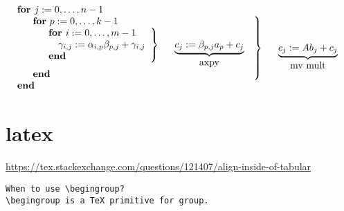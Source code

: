 \documentclass[a4paper,12pt]{article}
\begin{document}
\begingroup
\arraycolsep=1.4pt
\begin{equation*}
\begin{array}{l}
\textbf{for~}  j := 0, \ldots , n-1 \\
\hspace{1em}
\left. \begin{array}{l}
{\bf for~} p := 0, \ldots , k-1  \\
\hspace{1em}
\left. \begin{array}{l}
\textbf{for~} i := 0, \ldots , m-1  \\
\hspace{1em} \gamma_{i,j} := \alpha_{i,p} \beta_{p,j} + \gamma_{i,j}  \\
\textbf{end}
\end{array} \right\} \hspace{1em} \begin{array}[t]{c}
\underbrace{c_j := \beta_{p,j} a_p  + c_j}\\
\mbox{axpy}
\end{array}
\\
\textbf{end}
\end{array} \right\} \hspace{1em} \begin{array}[t]{c}
\underbrace{c_j := A b_j + c_j}\\
\mbox{mv mult}
\end{array}
\\
\textbf{end}
\end{array}
\end{equation*}
\endgroup


\appendix

\section{latex}

\url{https://tex.stackexchange.com/questions/121407/align-inside-of-tabular}


\begin{verbatim}
When to use \begingroup?
\begingroup is a TeX primitive for group.
\end{verbatim}
\end{document}
